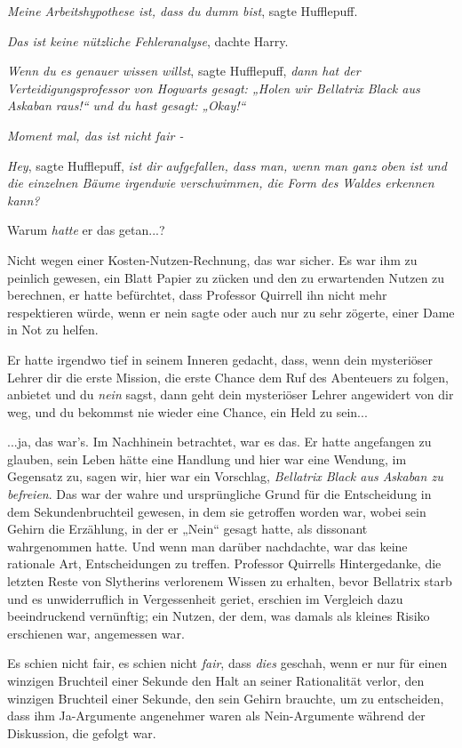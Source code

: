 {\emph{Meine Arbeitshypothese ist, dass du dumm bist}, sagte Hufflepuff.

\emph{Das ist keine nützliche Fehleranalyse}, dachte Harry.

\emph{Wenn du es genauer wissen willst}, sagte Hufflepuff, \emph{dann hat der Verteidigungsprofessor von Hogwarts gesagt: „Holen wir Bellatrix Black aus Askaban raus!“ und du hast gesagt: „Okay!“}

\emph{\emph{Moment mal, das ist nicht fair -}}

\emph{Hey}, sagte Hufflepuff, \emph{ist dir aufgefallen, dass man, wenn man ganz oben ist und die einzelnen Bäume irgendwie verschwimmen, die Form des Waldes erkennen kann?}

Warum \emph{hatte} er das getan...?

Nicht wegen einer Kosten-Nutzen-Rechnung, das war sicher. Es war ihm zu peinlich gewesen, ein Blatt Papier zu zücken und den zu erwartenden Nutzen zu berechnen, er hatte befürchtet, dass Professor Quirrell ihn nicht mehr respektieren würde, wenn er nein sagte oder auch nur zu sehr zögerte, einer Dame in Not zu helfen.

Er hatte irgendwo tief in seinem Inneren gedacht, dass, wenn dein mysteriöser Lehrer dir die erste Mission, die erste Chance dem Ruf des Abenteuers zu folgen, anbietet und du \emph{nein} sagst, dann geht dein mysteriöser Lehrer angewidert von dir weg, und du bekommst nie wieder eine Chance, ein Held zu sein...

...ja, das war's. Im Nachhinein betrachtet, war es das. Er hatte angefangen zu glauben, sein Leben hätte eine Handlung und hier war eine Wendung, im Gegensatz zu, sagen wir, hier war ein Vorschlag, \emph{Bellatrix Black aus Askaban zu befreien}. Das war der wahre und ursprüngliche Grund für die Entscheidung in dem Sekundenbruchteil gewesen, in dem sie getroffen worden war, wobei sein Gehirn die Erzählung, in der er „Nein“ gesagt hatte, als dissonant wahrgenommen hatte. Und wenn man darüber nachdachte, war das keine rationale Art, Entscheidungen zu treffen. Professor Quirrells Hintergedanke, die letzten Reste von Slytherins verlorenem Wissen zu erhalten, bevor Bellatrix starb und es unwiderruflich in Vergessenheit geriet, erschien im Vergleich dazu beeindruckend vernünftig; ein Nutzen, der dem, was damals als kleines Risiko erschienen war, angemessen war.

Es schien nicht fair, es schien nicht \emph{fair}, dass \emph{dies} geschah, wenn er nur für einen winzigen Bruchteil einer Sekunde den Halt an seiner Rationalität verlor, den winzigen Bruchteil einer Sekunde, den sein Gehirn brauchte, um zu entscheiden, dass ihm Ja-Argumente angenehmer waren als Nein-Argumente während der Diskussion, die gefolgt war.

}
